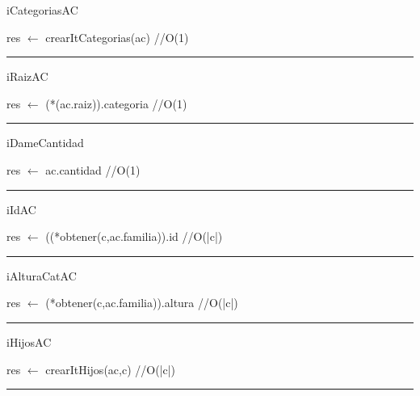 \begin{algorithm}[H]
\caption{iCategoriasAC}
\begin{algorithmic}[1]
\state res $\gets$ crearItCategorias(ac) \hfill //O(1)
\EndFunction 
\end{algorithmic}
\hrule
{}
\end{algorithm}

\begin{algorithm}[H]
\caption{iRaizAC}
\begin{algorithmic}[1]
\state res $\gets$ (*(ac.raiz)).categoria \hfill //O(1)
\EndFunction 
\end{algorithmic}
\hrule
{}
\end{algorithm}

\begin{algorithm}[H]
\caption{iDameCantidad}
\begin{algorithmic}[1]
\state res $\gets$ ac.cantidad \hfill //O(1)
\EndFunction 
\end{algorithmic}
\hrule
{}
\end{algorithm}

\begin{algorithm}[H]
\caption{iIdAC}
\begin{algorithmic}[1]
\state res $\gets$ ((*obtener(c,ac.familia)).id \hfill //O(|c|)
\EndFunction 
\end{algorithmic}
\hrule
{}
\end{algorithm}

\begin{algorithm}[H]
\caption{iAlturaCatAC}
\begin{algorithmic}[1]
\state res $\gets$ (*obtener(c,ac.familia)).altura \hfill //O(|c|)
\EndFunction 
\end{algorithmic}
\hrule
{}
\end{algorithm}

\begin{algorithm}[H]
\caption{iHijosAC}
\begin{algorithmic}[1]
\state res $\gets$ crearItHijos(ac,c) \hfill //O(|c|)
\EndFunction 
\end{algorithmic}
\hrule
{}
\end{algorithm}

